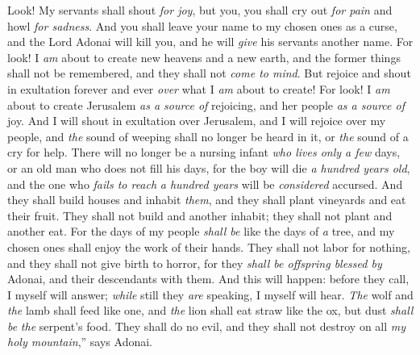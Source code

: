 \begin{biblechapter}
\verse Look! My servants shall shout \textit{for joy}, but you, you shall cry out \textit{for pain} and howl \textit{for sadness}.
\verse And you shall leave your name to my chosen ones as a curse, 
and the Lord Adonai will kill you, and he will \textit{give} his servants another name.
 For look! I \textit{am} about to create new heavens and a new earth, 
and the former things shall not be remembered, 
and they shall not \textit{come to mind}.
\verse But rejoice and shout in exultation forever and ever \textit{over} what I \textit{am} about to create! 
For look! I \textit{am} about to create Jerusalem \textit{as a source of} rejoicing, 
and her people \textit{as a source of} joy.
\verse And I will shout in exultation over Jerusalem, 
and I will rejoice over my people, 
and \textit{the} sound of weeping shall no longer be heard in it, 
or \textit{the} sound of a cry for help.
\verse There will no longer be a nursing infant \textit{who lives only a few} days, 
or an old man who does not fill his days, 
for the boy will die \textit{a hundred years old}, 
and the one who \textit{fails to reach} \textit{a hundred years} will be \textit{considered} accursed.
\verse And they shall build houses and inhabit \textit{them}, 
and they shall plant vineyards and eat their fruit.
\verse They shall not build and another inhabit; 
they shall not plant and another eat. 
For the days of my people \textit{shall be} like the days of \textit{a} tree, 
and my chosen ones shall enjoy the work of their hands.
\verse They shall not labor for nothing, 
and they shall not give birth to horror, 
for they \textit{shall be offspring blessed by} Adonai, 
and their descendants with them.
\verse And this will happen: before they call, I myself will answer; 
\textit{while} still they \textit{are} speaking, I myself will hear.
\verse \textit{The} wolf and \textit{the} lamb shall feed like one, 
and \textit{the} lion shall eat straw like the ox, 
but dust \textit{shall be} \textit{the} serpent’s food. 
They shall do no evil, 
and they shall not destroy on all \textit{my holy mountain},” says Adonai.
\end{biblechapter}

